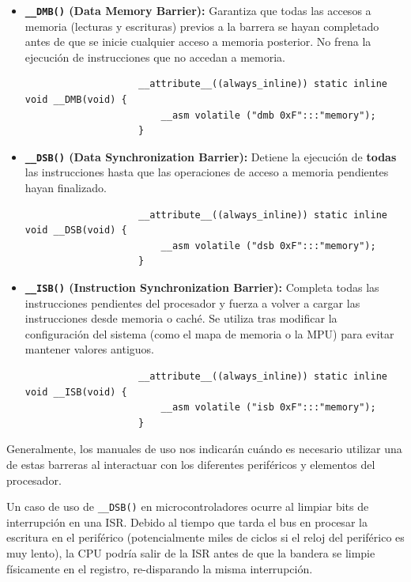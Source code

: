 \documentclass[../main.tex]{subfiles}
\begin{document}
        \begin{itemize}
            \item \textbf{\lstinline|__DMB()| (Data Memory Barrier):} Garantiza que todas las accesos a memoria (lecturas y escrituras) previos a la barrera se hayan completado antes de que se inicie cualquier acceso a memoria posterior. No frena la ejecución de instrucciones que no accedan a memoria.
                \begin{lstlisting}
                    __attribute__((always_inline)) static inline void __DMB(void) {
                        __asm volatile ("dmb 0xF":::"memory");
                    }
                \end{lstlisting}    

            \item \textbf{\lstinline|__DSB()| (Data Synchronization Barrier):} Detiene la ejecución de \textbf{todas} las instrucciones hasta que las operaciones de acceso a memoria pendientes hayan finalizado.
                \begin{lstlisting}
                    __attribute__((always_inline)) static inline void __DSB(void) {
                        __asm volatile ("dsb 0xF":::"memory");
                    }
                \end{lstlisting}

            \item \textbf{\lstinline|__ISB()| (Instruction Synchronization Barrier):} Completa todas las instrucciones pendientes del procesador y fuerza a volver a cargar las instrucciones desde memoria o caché. Se utiliza tras modificar la configuración del sistema (como el mapa de memoria o la MPU) para evitar mantener valores antiguos.
                \begin{lstlisting}
                    __attribute__((always_inline)) static inline void __ISB(void) {
                        __asm volatile ("isb 0xF":::"memory");
                    }
                \end{lstlisting}
        \end{itemize}

        Generalmente, los manuales de uso nos indicarán cuándo es necesario utilizar una de estas barreras al interactuar con los diferentes periféricos y elementos del procesador. 

        Un caso de uso de \lstinline|__DSB()| en microcontroladores ocurre al limpiar bits de interrupción en una ISR. Debido al tiempo que tarda el bus en procesar la escritura en el periférico (potencialmente miles de ciclos si el reloj del periférico es muy lento), la CPU podría salir de la ISR antes de que la bandera se limpie físicamente en el registro, re-disparando la misma interrupción. 
\end{document}

